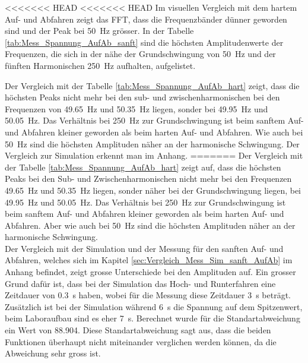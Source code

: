 <<<<<<< HEAD
<<<<<<< HEAD
Im visuellen Vergleich mit dem hartem Auf- und Abfahren zeigt das FFT, dass die Frequenzbänder dünner geworden sind und der Peak bei \SI{50}{Hz} grösser. In der Tabelle \ref{tab:Mess_Spannung_AufAb_sanft} sind die höchsten Amplitudenwerte der Frequenzen, die sich in der nähe der Grundschwingung von \SI{50}{Hz} und der fünften Harmonischen \SI{250}{Hz} aufhalten, aufgelistet. 

Der Vergleich mit der Tabelle \ref{tab:Mess_Spannung_AufAb_hart} zeigt, dass die höchsten Peaks nicht mehr bei den sub- und zwischenharmonischen bei den Frequenzen von \SI{49.65}{Hz} und \SI{50.35}{Hz} liegen, sonder bei \SI{49.95}{Hz} und \SI{50.05}{Hz}. Das Verhältnis bei \SI{250}{Hz} zur Grundschwingung ist beim sanftem Auf- und Abfahren kleiner geworden als beim harten Auf- und Abfahren. Wie auch bei \SI{50}{Hz} sind die höchsten Amplituden näher an der harmonische Schwingung. Der Vergleich zur Simulation erkennt man im Anhang.
=======
Der Vergleich mit der Tabelle \ref{tab:Mess_Spannung_AufAb_hart} zeigt auf, dass die höchsten Peaks bei den Sub- und Zwischenharmonischen nicht mehr bei den Frequenzen \SI{49.65}{Hz} und \SI{50.35}{Hz} liegen, sonder näher bei der Grundschwingung liegen, bei \SI{49.95}{Hz} und \SI{50.05}{Hz}. Das Verhältnis bei \SI{250}{Hz} zur Grundschwingung ist beim sanftem Auf- und Abfahren kleiner geworden als beim harten Auf- und Abfahren. Aber wie auch bei \SI{50}{Hz} sind die höchsten Amplituden näher an der harmonische Schwingung. \\
Der Vergleich mit der Simulation und der Messung für den sanften Auf- und Abfahren, welches sich im Kapitel \ref{sec:Vergleich_Mess_Sim_sanft_AufAb} im Anhang befindet, zeigt grosse Unterschiede bei den Amplituden auf. Ein grosser Grund dafür ist, dass bei der Simulation das Hoch- und Runterfahren eine Zeitdauer von \SI{0.3}{s} haben, wobei für die Messung diese Zeitdauer \SI{3}{s} beträgt. Zusätzlich ist bei der Simulation während \SI{6}{s} die Spannung auf dem Spitzenwert, beim Laboraufbau sind es eher \SI{7}{s}.  Berechnet wurde für die Standartabweichung ein Wert von 88.904. Diese Standartabweichung sagt aus, dass die beiden Funktionen überhaupt nicht miteinander verglichen werden können, da die Abweichung sehr gross ist.





